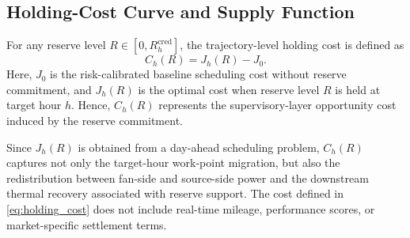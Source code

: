 \documentclass[journal]{IEEEtran}
\theoremstyle{remark}
\begin{document}



\subsection{Holding-Cost Curve and Supply Function}
\label{subsec:cost_supply_function}

For any reserve level
$R\in[0,R_h^{\mathrm{cred}}]$, the trajectory-level holding cost
is defined as
\begin{equation}
	C_h(R)
	=
	J_h(R)-J_0 .
	\label{eq:holding_cost}
\end{equation}
Here, $J_0$ is the risk-calibrated baseline scheduling cost
without reserve commitment, and $J_h(R)$ is the optimal cost
when reserve level $R$ is held at target hour $h$. Hence,
$C_h(R)$ represents the supervisory-layer opportunity cost
induced by the reserve commitment.

Since $J_h(R)$ is obtained from a day-ahead scheduling
problem, $C_h(R)$ captures not only the target-hour work-point
migration, but also the redistribution between fan-side and
source-side power and the downstream thermal recovery
associated with reserve support. The cost defined in
\eqref{eq:holding_cost} does not include real-time mileage,
performance scores, or market-specific settlement terms.
\end{document}
